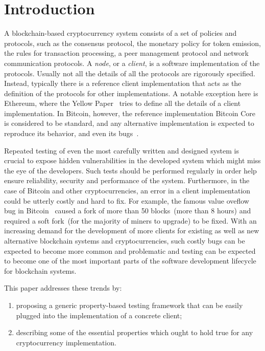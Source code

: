 
\section{Introduction}

A blockchain-based cryptocurrency system consists of a set of policies and protocols, such as the consensus protocol, the monetary policy for token emission, the rules for transaction processing, a peer management protocol and network communication protocols. A \emph{node}, or a {\em client}, is a software implementation of the protocols. Usually not all the details of all the protocols are rigorously specified. Instead, typically there is a reference client implementation that acts as the  definition of the protocols for other implementations. A notable exception here is Ethereum, where the Yellow Paper~\cite{ethyp} tries to define all the details of a client implementation. In Bitcoin, however, the reference implementation Bitcoin Core is considered to be standard, and any alternative implementation is expected to reproduce its behavior, and even its bugs~\cite{bitbugs}.

Repeated testing of even the most carefully written and designed system is crucial to expose hidden vulnerabilities in the developed system which might miss the eye of the developers. Such tests should be performed regularly in order help ensure reliability, security and performance of the system. Furthermore, in the case of Bitcoin and other cryptocurrencies, an error in a client implementation could be utterly costly and hard to fix. For example, the famous value oveflow bug in Bitcoin~\cite{overflow} caused a fork of more than 50 blocks~(more than 8 hours) and required a soft fork~(for the majority of miners to upgrade) to be fixed. With an increasing demand for the development of more clients for existing as well as new alternative blockchain systems and cryptocurrencies, such costly bugs can be expected to become more common and problematic and testing can be expected to become one of the most important parts of the software development lifecycle for blockchain systems.

This paper addresses these trends by:
\begin{enumerate}
\item proposing a generic property-based testing framework that can be easily plugged into the implementation of a concrete client;
\item describing some of the essential properties which ought to hold true for any cryptocurrency implementation.
\end{enumerate}

